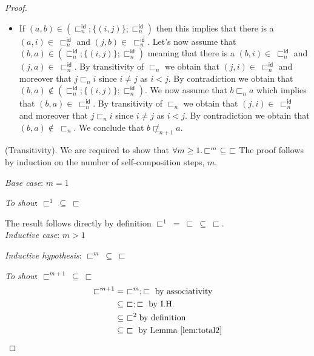 \begin{thm}
\begin{proof}
{\begin{itemize}
		\item If $(a, b) \in \left( \sqsubset_n^\mathsf{id} ; \{ (i, j) \} ; \sqsubset_n ^\mathsf{id} \right)$ then this implies that there is a $(a, i) \in\ \sqsubset_n^\mathsf{id}$ and $(j, b) \in\ \sqsubset_n^\mathsf{id}$. Let's now assume that $(b, a) \in \left( \sqsubset_n^\mathsf{id} ; \{ (i, j) \} ; \sqsubset_n ^\mathsf{id} \right)$ meaning that there is a $(b, i) \in\ \sqsubset_n^\mathsf{id}$ and $(j, a) \in\ \sqsubset_n^\mathsf{id}$. By transitivity of $\sqsubset_n$ we obtain that $(j, i) \in\ \sqsubset_n^\mathsf{id}$ and moreover that $j \sqsubset_n i$ since $i \neq j$ as $i < j$. By contradiction we obtain that $(b, a) \not\in \left( \sqsubset_n^\mathsf{id} ; \{ (i, j) \} ; \sqsubset_n ^\mathsf{id} \right)$. We now assume that $b \sqsubset_n a$ which implies that $(b, a) \in\ \sqsubset_n^\mathsf{id}$. By transitivity of $\sqsubset_n$ we obtain that $(j, i) \in\ \sqsubset_n^\mathsf{id}$ and moreover that $j \sqsubset_n i$ since $i \neq j$ as $i < j$. By contradiction we obtain that $(b, a) \not\in\ \sqsubset_n$. We conclude that $b \not\sqsubset_{n + 1} a$.
	\end{itemize}
	}
	\indline
	(Transitivity). We are required to show that $\forall m \geq 1 \ldotp \sqsubset^m\ \subseteq\ \sqsubset$ The proof follows by induction on the number of self-composition steps, $m$.
	
	{\parindent0pt
	\textit{Base case}: $m = 1$
	
	\textit{To show}: $\sqsubset^1\ \subseteq\ \sqsubset$
	
	The result follows directly by definition $\sqsubset^1\ =\ \sqsubset\ \subseteq\ \sqsubset$. \\
	
	\textit{Inductive case}: $m > 1$
	
	\textit{Inductive hypothesis}: $\sqsubset^m\ \subseteq\ \sqsubset$
	
	\textit{To show}: $\sqsubset^{m + 1}\ \subseteq\ \sqsubset$
	\begin{align*}
		\sqsubset^{m + 1}
		&=\ \sqsubset^m ; \sqsubset \text{ by associativity} \\
		&\subseteq\ \sqsubset ; \sqsubset \text{ by I.H.} \\
		&\subseteq\ \sqsubset^2 \text{by definition} \\
		&\subseteq\ \sqsubset \text{ by Lemma \ref{lem:total2}}
	\end{align*}
	}
	

\end{proof}
\end{thm}
